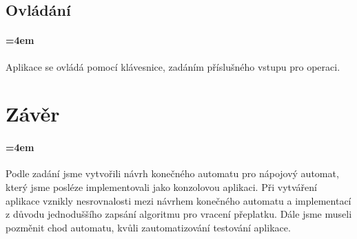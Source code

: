 \documentclass[12pt,a4paper]{article}
\begin{document}
\subsection{Ovládání}

\paragraph{\parindent=4em}{	
	Aplikace se ovládá pomocí klávesnice, zadáním příslušného vstupu pro operaci.
}

\section{Závěr}

\paragraph{\parindent=4em}{	
	Podle zadání jsme vytvořili návrh konečného automatu pro nápojový automat, který jsme posléze implementovali jako konzolovou aplikaci. Při vytváření aplikace vznikly nesrovnalosti mezi návrhem konečného automatu a implementací z důvodu jednoduššího zapsání algoritmu pro vracení přeplatku. Dále jsme museli pozměnit chod automatu, kvůli zautomatizování testování aplikace.
}

%
%
\end{document}
